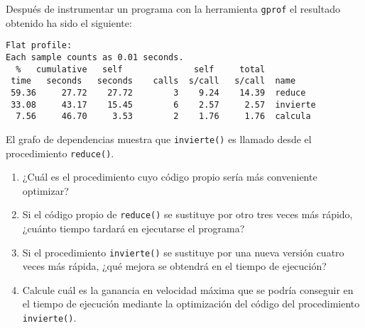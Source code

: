 \begin{ejercicio}
    Después de instrumentar un programa con la herramienta \verb|gprof| el resultado obtenido ha sido el siguiente:
    \begin{verbatim}
Flat profile:
Each sample counts as 0.01 seconds.
  %   cumulative   self              self     total           
 time   seconds   seconds    calls  s/call   s/call  name    
 59.36     27.72    27.72        3    9.24    14.39  reduce  
 33.08     43.17    15.45        6    2.57     2.57  invierte
  7.56     46.70     3.53        2    1.76     1.76  calcula
    \end{verbatim}

    El grafo de dependencias muestra que \verb|invierte()| es llamado desde el procedimiento \verb|reduce()|.
    \begin{enumerate}
        \item ¿Cuál es el procedimiento cuyo código propio sería más conveniente optimizar?
        \item Si el código propio de \verb|reduce()| se sustituye por otro tres veces más rápido, ¿cuánto tiempo tardará en ejecutarse el programa?
        \item Si el procedimiento \verb|invierte()| se sustituye por una nueva versión cuatro veces más rápida, ¿qué mejora se obtendrá en el tiempo de ejecución?
        \item Calcule cuál es la ganancia en velocidad máxima que se podría conseguir en el tiempo de ejecución mediante la optimización del código del procedimiento \verb|invierte()|.
    \end{enumerate}
\end{ejercicio}
\begin{comment}
    Solución:
    \begin{enumerate}
        \item Deberíamos optimizar \verb|reduce()| ya que su código propio consume casi el 60\% de tiempo de CPU del programa.
        \item El programa se ejecutaría en 28,22 s.
        \item El programa se ejecutaría 1,33 veces más rápidamente.
        \item La máxima ganancia en velocidad que se podría conseguir es 1,49.
    \end{enumerate}
\end{comment}

